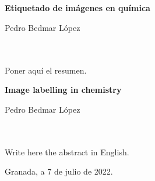 \chapter*{}


\thispagestyle{empty}

\begin{center}
{\large\bfseries Etiquetado de imágenes en química}\\
\end{center}
\begin{center}
Pedro Bedmar López\\
\end{center}

\\

\vspace{0.7cm}
\\

Poner aquí el resumen.
\cleardoublepage


\thispagestyle{empty}


\begin{center}
{\large\bfseries Image labelling in chemistry}\\
\end{center}
\begin{center}
Pedro Bedmar López\\
\end{center}

\\

\vspace{0.7cm}
\\

Write here the abstract in English.



\begin{flushright}
Granada, a 7 de julio de 2022.
\end{flushright}


\chapter*{}
\thispagestyle{empty}

